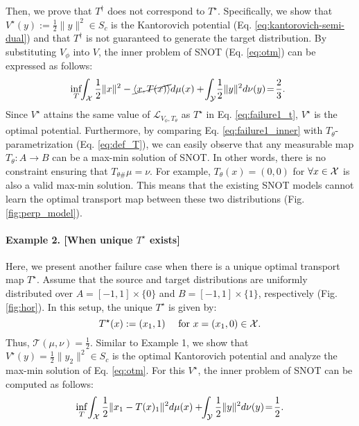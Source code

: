 Then, we prove that $T^{\dagger}$ does not correspond to $T^{\star}$. Specifically, we show that $V^{\star}(y) := \frac{1}{2} \lVert y \rVert^2 \in S_{c}$ is the Kantorovich potential (Eq. \ref{eq:kantorovich-semi-dual}) and that $T^{\dagger}$ is not guaranteed to generate the target distribution. By substituting $V_\phi$ into $V$, the inner problem of SNOT (Eq. \ref{eq:otm}) can be expressed as follows:
\vspace{-5pt}
\begin{multline} \label{eq:failure1_inner}
    \!\!\!\inf_{T} \!\!\int_{\mathcal{X}} \frac{1}{2} \lVert x\rVert^2 - \cancel{\langle x, T(x)\rangle} d\mu(x)  + \!\int_{\mathcal{Y}}\! \frac{1}{2} \lVert y \rVert^2 d\nu(y) \!= \!\frac{2}{3}.
\end{multline} 
Since $V^{\star}$ attains the same value of $\mathcal{L}_{V_{\phi}, T_{\theta}}$ as $T^{\star}$ in Eq. \ref{eq:failure1_t}, $V^{\star}$ is the optimal potential. Furthermore, by comparing Eq. \ref{eq:failure1_inner} with $T_{\theta}$-parametrization (Eq. \ref{eq:def_T}), we can easily observe that any measurable map $T_{\theta}:A\rightarrow B$ can be a max-min solution of SNOT. In other words, there is no constraint ensuring that $T_{\theta \#} \mu = \nu$. For example, $T_{\theta}(x) = (0,0)$ for $\forall x \in {\mathcal{X}}$ is also a valid max-min solution. This means that the existing SNOT models cannot learn the optimal transport map between these two distributions (Fig. \ref{fig:perp_model}).


\paragraph{Example 2. [When unique $T^{\star}$ exists]}
Here, we present another failure case when there is a unique optimal transport map $T^{\star}$. Assume that the source and target distributions are uniformly distributed over $A = [-1,1]\times \{0 \}$ and $B=[-1,1]\times \{1\}$, respectively (Fig. \ref{fig:hor}). In this setup, the unique $T^{\star}$ is given by:
\begin{equation}
    T^{\star}(x) := (x_1,1) \quad \text{ for } x=(x_1, 0) \in {\mathcal{X}}.
\end{equation}
Thus, $\mathcal{T}(\mu, \nu) = \frac{1}{2}$. Similar to Example 1, we show that $V^{\star}(y) = \frac{1}{2} \lVert y_2 \rVert^2 \in S_{c}$ is the optimal Kantorovich potential and analyze the max-min solution of Eq. \ref{eq:otm}. For this $V^{\star}$, the inner problem of SNOT can be computed as follows:
\begin{equation}  \label{eq:failure2_inner}
    \inf_{T}\! \int_{\mathcal{X}} \frac{1}{2} \lVert x_1 - T(x)_1 \rVert^2 d\mu(x) + \!\!\int_{\mathcal{Y}} \frac{1}{2} \lVert y \rVert^2 d\nu(y) \!=\! \frac{1}{2}.
    \vspace{-5pt}
\end{equation} 

